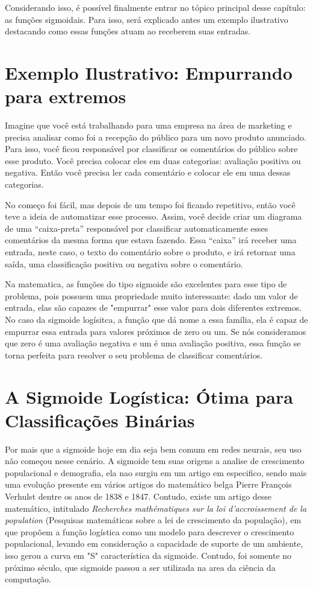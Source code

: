 Considerando isso, é possível finalmente entrar no tópico principal desse capítulo: as funções sigmoidais. Para isso, será explicado antes um exemplo ilustrativo destacando como essas funções atuam ao receberem suas entradas.

\section{Exemplo Ilustrativo: Empurrando para extremos}

Imagine que você está trabalhando para uma empresa na área de marketing e precisa analisar como foi a recepção do público para um novo produto anunciado. Para isso, você ficou responsável por classificar os comentários do público sobre esse produto. Você precisa colocar eles em duas categorias: avaliação positiva ou negativa. Então você precisa ler cada comentário e colocar ele em uma dessas categorias. 

No começo foi fácil, mas depois de um tempo foi ficando repetitivo, então você teve a ideia de automatizar esse processo. Assim, você decide criar um diagrama de uma “caixa-preta” responsável por classificar automaticamente esses comentários da mesma forma que estava fazendo. Essa “caixa” irá receber uma entrada, neste caso, o texto do comentário sobre o produto, e irá retornar uma saída, uma classificação positiva ou negativa sobre o comentário. 

Na matematica, as funções do tipo sigmoide são excelentes para esse tipo de problema, pois possuem uma propriedade muito interessante: dado um valor de entrada, elas são capazes de "empurrar" esse valor para dois diferentes extremos. No caso da sigmoide logísitca, a função que dá nome a essa família, ela é capaz de empurrar essa entrada para valores próximos de zero ou um. Se nós consideramos que zero é uma avaliação negativa e um é uma avaliação positiva, essa função se torna perfeita para resolver o seu problema de classificar comentários.

\section{A Sigmoide Logística: Ótima para Classificações Binárias}

Por mais que a sigmoide hoje em dia seja bem comum em redes neurais, seu uso não começou nesse cenário. A sigmoide tem suas origens a analise de crescimento populacional e demografia, ela nao surgiu em um artigo em especifico, sendo mais uma evolução presente em vários artigos do matemático belga Pierre François Verhulst dentre os anos de 1838 e 1847. Contudo, existe um artigo desse matemático, intitulado \textit{Recherches mathématiques sur la loi d'accroissement de la population} (Pesquisas matemáticas sobre a lei de crescimento da população), em que \textcite{SigmoidVerhulst1845} propõem a função logística como um modelo para descrever o crescimento populacional, levando em consideração a capacidade de suporte de um ambiente, isso gerou a curva em "S" característica da sigmoide. Contudo, foi somente no próximo século, que sigmoide passou a ser utilizada na area da ciência da computação.

